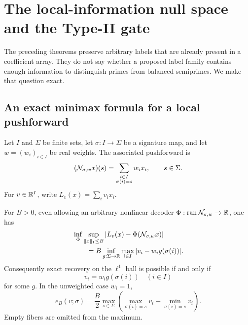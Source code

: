 \section{The local-information null space and the Type-II gate}
\label{sec:local-typeii-gate}

The preceding theorems preserve arbitrary labels that are already present
in a coefficient array.  They do not say whether a proposed label family
contains enough information to distinguish primes from balanced
semiprimes.  We make that question exact.

\subsection{An exact minimax formula for a local pushforward}

Let $I$ and $\Sigma$ be finite sets, let
$\sigma:I\to\Sigma$ be a signature map, and let $w=(w_i)_{i\in I}$ be
real weights.  The associated pushforward is
\begin{equation}
 (\mathcal N_{\sigma,w}x)(s)
 =\sum_{\substack{i\in I\\\sigma(i)=s}}w_i x_i,
 \qquad s\in\Sigma.
 \label{eq:local-pushforward}
\end{equation}
For $v\in\mathbb R^I$, write $L_v(x)=\sum_i v_ix_i$.

\begin{theorem}
\label{thm:local-minimax}
For $B>0$, even allowing an arbitrary nonlinear decoder
$\Phi:\operatorname{ran}\mathcal N_{\sigma,w}\to\mathbb R$, one has
\begin{align}
 &\inf_{\Phi}
 \sup_{\|x\|_1\leq B}
 \left|L_v(x)-\Phi(\mathcal N_{\sigma,w}x)\right|
 \notag\\
 &\qquad={}
 B\inf_{g:\Sigma\to\mathbb R}
 \max_{i\in I}|v_i-w_i g(\sigma(i))|.
 \label{eq:local-minimax}
\end{align}
Consequently exact recovery on the $\ell^1$ ball is possible if and only if
\begin{equation}
 v_i=w_i g(\sigma(i))
 \quad(i\in I)
 \label{eq:local-exact-recovery}
\end{equation}
for some $g$.  In the unweighted case $w_i=1$,
\begin{equation}
 e_B(v;\sigma)
 =\frac B2\max_{s\in\Sigma}
 \left(
 \max_{\sigma(i)=s}v_i-\min_{\sigma(i)=s}v_i
 \right).
 \label{eq:unweighted-fiber-oscillation}
\end{equation}
Empty fibers are omitted from the maximum.
\end{theorem}

